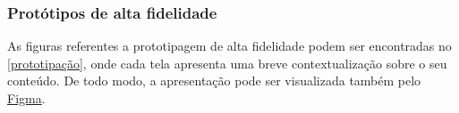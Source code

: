 \subsubsection{Protótipos de alta fidelidade}
As figuras referentes a prototipagem de alta fidelidade podem ser encontradas no \autoref{prototipação}, onde cada tela apresenta uma breve contextualização sobre o seu conteúdo. De todo modo, a apresentação pode ser visualizada também pelo \href{https://www.figma.com/proto/GhIlybDubGmr3NkRU0a9GP/Protótipo---IFriends?node-id=73\%3A321}{Figma}.
